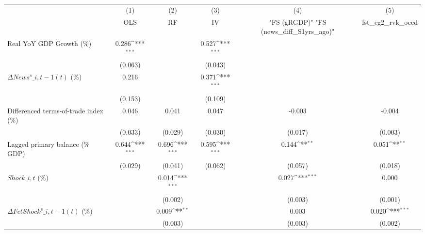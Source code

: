 {
\def\sym#1{\ifmmode^{#1}\else\(^{#1}\)\fi}
\begin{tabular}{l*{5}{c}}
\toprule
                    &\multicolumn{1}{c}{(1)}&\multicolumn{1}{c}{(2)}&\multicolumn{1}{c}{(3)}&\multicolumn{1}{c}{(4)}&\multicolumn{1}{c}{(5)}\\
                    &\multicolumn{1}{c}{OLS}&\multicolumn{1}{c}{RF}&\multicolumn{1}{c}{IV}&\multicolumn{1}{c}{ "FS (gRGDP)"  "FS (news\_diff\_S1yrs\_ago)" }&\multicolumn{1}{c}{fst\_eg2\_rvk\_oecd}\\
\midrule
Real YoY GDP Growth (\%)&       0.286\sym{***}&                     &       0.527\sym{***}&                     &                     \\
                    &     (0.063)         &                     &     (0.043)         &                     &                     \\
\addlinespace
$ \Delta News^s\_{i,t-1}(t)$ (\%)&       0.216         &                     &       0.371\sym{***}&                     &                     \\
                    &     (0.153)         &                     &     (0.109)         &                     &                     \\
\addlinespace
Differenced terms-of-trade index (\%)&       0.046         &       0.041         &       0.047         &      -0.003         &      -0.004         \\
                    &     (0.033)         &     (0.029)         &     (0.030)         &     (0.017)         &     (0.003)         \\
\addlinespace
Lagged primary balance (\% GDP)&       0.644\sym{***}&       0.696\sym{***}&       0.595\sym{***}&       0.144\sym{**} &       0.051\sym{**} \\
                    &     (0.029)         &     (0.041)         &     (0.062)         &     (0.057)         &     (0.018)         \\
\addlinespace
$ Shock\_{i,t}$ (\%) &                     &       0.014\sym{***}&                     &       0.027\sym{***}&       0.000         \\
                    &                     &     (0.002)         &                     &     (0.003)         &     (0.001)         \\
\addlinespace
$ \Delta FctShock^s\_{i,t-1}(t)$ (\%)&                     &       0.009\sym{**} &                     &       0.003         &       0.020\sym{***}\\
                    &                     &     (0.003)         &                     &     (0.003)         &     (0.002)         \\

\end{tabular}}
